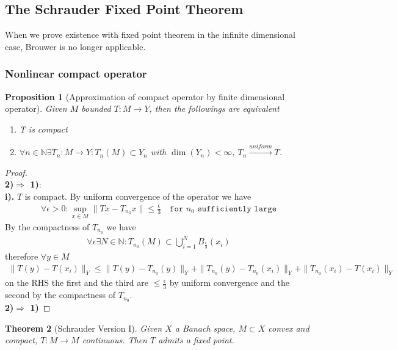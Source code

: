 \documentclass[a4paper,11pt,oneside,fleqn]{book}
\newtheorem{theorem}{Theorem}[section]
\newtheorem{proposition}[theorem]{Proposition}
\theoremstyle{definition}
\theoremstyle{remark}
\begin{document}
\subsection{The Schrauder Fixed Point Theorem}
When we prove existence with fixed point theorem in the infinite dimensional case, Brouwer is no longer applicable. 

\subsubsection{Nonlinear compact operator }
\begin{proposition}[Approximation of compact operator by finite dimensional operator]
Given $M$ bounded $T: M \rightarrow Y$, then the followings are equivalent
\begin{enumerate}
	\item T is compact
	\item $\forall n \in \mathbb{N} \exists T_n : M \rightarrow Y: T_n(M) \subset Y_n$ with $\dim (Y_n) < \infty$, $T_n \overset{uniform}{\rightarrow} T$. 
\end{enumerate}
\end{proposition}
\begin{proof}\quad\\
\textbf{2)$\Rightarrow$ 1)}: \\
\textbf{i).} $T$ is compact. By uniform convergence of the operator we have
\begin{align*}
	\forall \epsilon > 0: \sup_{x \in M} \|Tx - T_{n_0}x \| \le \frac{\epsilon}{3} \quad \texttt{for $n_0$ sufficiently large}
\end{align*}
By the compactness of $T_{n_0}$ we have
\begin{align*}
	\forall \epsilon  \exists N \in \mathbb{N}: T_{n_0}(M) \subset \bigcup_{i = 1}^N B_{\frac{\epsilon}{3}} (x_i)
\end{align*}
therefore $\forall y \in M$
\begin{align*}
	\|T( y) - T(x_i)\|_Y \le \|T(y) - T_{n_0} (y)\|_Y + \|T_{n_0}(y) - T_{n_0}(x_i)\|_Y + \|T_{n_0}(x_i) - T(x_i)\|_Y
\end{align*}
on the RHS the first and the third are $\le \frac{\epsilon}{3}$ by uniform convergence and the second by the compactness of $T_{n_0}$. \\
\textbf{2)$ \Rightarrow$ 1)} 
\end{proof}



\begin{theorem}[Schrauder Version I]
	Given $X$ a Banach space, $M \subset X$ convex and compact, $T: M \rightarrow M$ continuous. Then $T$ admits a fixed point. 
\end{theorem}
\end{document}
